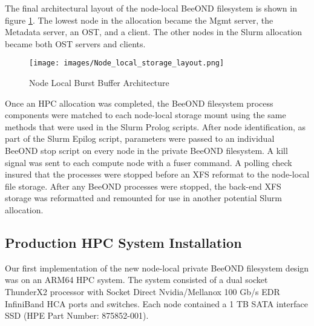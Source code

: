 The final architectural layout of the node-local BeeOND filesystem is shown in figure \ref{fig:Node_local_storage_layout}.  The lowest node in the allocation became the Mgmt server, the Metadata server, an OST, and a client.  The other nodes in the Slurm allocation became both OST servers and clients.

\begin{figure}[!htb]
  \centerline{\texttt{[image: images/Node\_local\_storage\_layout.png]}}
  \caption{Node Local Burst Buffer Architecture}
  \label{fig:Node_local_storage_layout}
\end{figure}


Once an HPC allocation was completed, the BeeOND filesystem process components were matched to each node-local storage mount using the same methods that were used in the Slurm Prolog scripts. After node identification, as part of the Slurm Epilog script, parameters were passed to an individual BeeOND stop script on every node in the private BeeOND filesystem.  A kill signal was sent to each compute node with a fuser command.  A polling check insured that the processes were stopped before an XFS reformat to the node-local file storage. After any BeeOND processes were stopped, the back-end XFS storage was reformatted and remounted for use in another potential Slurm allocation.

\subsection{Production HPC System Installation}


Our first implementation of the new node-local private BeeOND filesystem design was on an ARM64 HPC system.  The system consisted of a dual socket ThunderX2 processor with Socket Direct Nvidia/Mellanox 100 Gb/s EDR InfiniBand HCA ports and switches.  Each node contained a 1 TB SATA interface SSD (HPE Part Number: 875852-001).  



